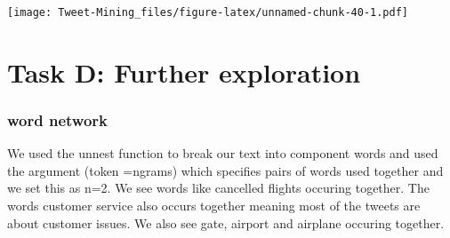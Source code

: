 \documentclass[
]{article}
\newenvironment{Shaded}{\begin{snugshade}}{\end{snugshade}}
\newcommand{\CommentTok}[1]{\textcolor[rgb]{0.56,0.35,0.01}{\textit{#1}}}
\newcommand{\DataTypeTok}[1]{\textcolor[rgb]{0.13,0.29,0.53}{#1}}
\newcommand{\DecValTok}[1]{\textcolor[rgb]{0.00,0.00,0.81}{#1}}
\newcommand{\KeywordTok}[1]{\textcolor[rgb]{0.13,0.29,0.53}{\textbf{#1}}}
\newcommand{\NormalTok}[1]{#1}
\newcommand{\OperatorTok}[1]{\textcolor[rgb]{0.81,0.36,0.00}{\textbf{#1}}}
\newcommand{\OtherTok}[1]{\textcolor[rgb]{0.56,0.35,0.01}{#1}}
\newcommand{\StringTok}[1]{\textcolor[rgb]{0.31,0.60,0.02}{#1}}
\begin{document}
\begin{Shaded}
\end{Shaded}

\texttt{[image: Tweet-Mining\_files/figure-latex/unnamed-chunk-40-1.pdf]}

\hypertarget{task-d-further-exploration}{%
\section{Task D: Further exploration}\label{task-d-further-exploration}}

\hypertarget{word-network}{%
\subsubsection{word network}\label{word-network}}

We used the unnest function to break our text into component words and
used the argument (token =ngrams) which specifies pairs of words used
together and we set this as n=2. We see words like cancelled flights
occuring together. The words customer service also occurs together
meaning most of the tweets are about customer issues. We also see gate,
airport and airplane occuring together.
\end{document}
